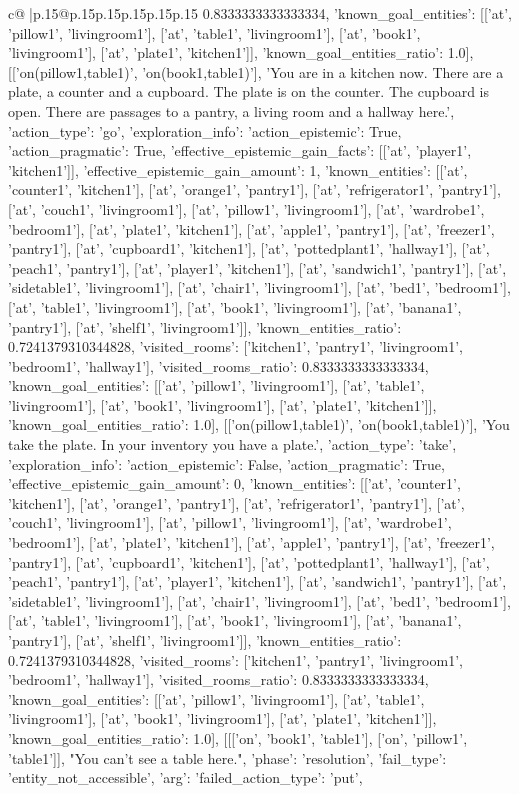 \documentclass{article}
\begin{document}
{\begin{supertabular}{c@{$\;$}|p{.15\linewidth}@{}p{.15\linewidth}p{.15\linewidth}p{.15\linewidth}p{.15\linewidth}p{.15\linewidth}}
{{{0.8333333333333334, 'known_goal_entities': [['at', 'pillow1', 'livingroom1'], ['at', 'table1', 'livingroom1'], ['at', 'book1', 'livingroom1'], ['at', 'plate1', 'kitchen1']], 'known_goal_entities_ratio': 1.0}}], [['on(pillow1,table1)', 'on(book1,table1)'], 'You are in a kitchen now. There are a plate, a counter and a cupboard. The plate is on the counter. The cupboard is open. There are passages to a pantry, a living room and a hallway here.\n', {'action_type': 'go', 'exploration_info': {'action_epistemic': True, 'action_pragmatic': True, 'effective_epistemic_gain_facts': [['at', 'player1', 'kitchen1']], 'effective_epistemic_gain_amount': 1, 'known_entities': [['at', 'counter1', 'kitchen1'], ['at', 'orange1', 'pantry1'], ['at', 'refrigerator1', 'pantry1'], ['at', 'couch1', 'livingroom1'], ['at', 'pillow1', 'livingroom1'], ['at', 'wardrobe1', 'bedroom1'], ['at', 'plate1', 'kitchen1'], ['at', 'apple1', 'pantry1'], ['at', 'freezer1', 'pantry1'], ['at', 'cupboard1', 'kitchen1'], ['at', 'pottedplant1', 'hallway1'], ['at', 'peach1', 'pantry1'], ['at', 'player1', 'kitchen1'], ['at', 'sandwich1', 'pantry1'], ['at', 'sidetable1', 'livingroom1'], ['at', 'chair1', 'livingroom1'], ['at', 'bed1', 'bedroom1'], ['at', 'table1', 'livingroom1'], ['at', 'book1', 'livingroom1'], ['at', 'banana1', 'pantry1'], ['at', 'shelf1', 'livingroom1']], 'known_entities_ratio': 0.7241379310344828, 'visited_rooms': ['kitchen1', 'pantry1', 'livingroom1', 'bedroom1', 'hallway1'], 'visited_rooms_ratio': 0.8333333333333334, 'known_goal_entities': [['at', 'pillow1', 'livingroom1'], ['at', 'table1', 'livingroom1'], ['at', 'book1', 'livingroom1'], ['at', 'plate1', 'kitchen1']], 'known_goal_entities_ratio': 1.0}}], [['on(pillow1,table1)', 'on(book1,table1)'], 'You take the plate. In your inventory you have a plate.\n', {'action_type': 'take', 'exploration_info': {'action_epistemic': False, 'action_pragmatic': True, 'effective_epistemic_gain_amount': 0, 'known_entities': [['at', 'counter1', 'kitchen1'], ['at', 'orange1', 'pantry1'], ['at', 'refrigerator1', 'pantry1'], ['at', 'couch1', 'livingroom1'], ['at', 'pillow1', 'livingroom1'], ['at', 'wardrobe1', 'bedroom1'], ['at', 'plate1', 'kitchen1'], ['at', 'apple1', 'pantry1'], ['at', 'freezer1', 'pantry1'], ['at', 'cupboard1', 'kitchen1'], ['at', 'pottedplant1', 'hallway1'], ['at', 'peach1', 'pantry1'], ['at', 'player1', 'kitchen1'], ['at', 'sandwich1', 'pantry1'], ['at', 'sidetable1', 'livingroom1'], ['at', 'chair1', 'livingroom1'], ['at', 'bed1', 'bedroom1'], ['at', 'table1', 'livingroom1'], ['at', 'book1', 'livingroom1'], ['at', 'banana1', 'pantry1'], ['at', 'shelf1', 'livingroom1']], 'known_entities_ratio': 0.7241379310344828, 'visited_rooms': ['kitchen1', 'pantry1', 'livingroom1', 'bedroom1', 'hallway1'], 'visited_rooms_ratio': 0.8333333333333334, 'known_goal_entities': [['at', 'pillow1', 'livingroom1'], ['at', 'table1', 'livingroom1'], ['at', 'book1', 'livingroom1'], ['at', 'plate1', 'kitchen1']], 'known_goal_entities_ratio': 1.0}}], [[['on', 'book1', 'table1'], ['on', 'pillow1', 'table1']], "You can't see a table here.\n", {'phase': 'resolution', 'fail_type': 'entity_not_accessible', 'arg': {'failed_action_type': 'put', }}}
\end{supertabular}}
\end{document}
